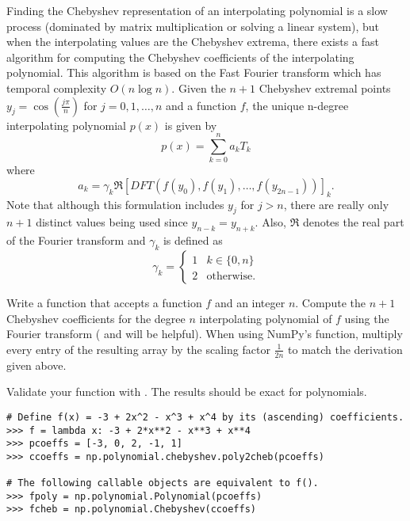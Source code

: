Finding the Chebyshev representation of an interpolating polynomial is a slow process (dominated by matrix multiplication or solving a linear system), but when the interpolating values are the
Chebyshev extrema, there exists a fast algorithm for computing the Chebyshev coefficients of the interpolating polynomial.
This algorithm is based on the Fast Fourier transform which has temporal complexity $O(n\log n)$.
Given the $n+1$ Chebyshev extremal points $y_j=\cos(\frac{j\pi}{n})$ for $j=0,1,\dots,n$ and a function $f$, the unique n-degree interpolating polynomial $p(x)$ is given by
\[
p(x)=\sum_{k=0}^na_kT_k
\]
where
\[
a_k = \gamma_k \Re \left[ DFT(f(y_0), f(y_1),\dots, f(y_{2n-1}))\right]_k.
\]
Note that although this formulation includes $y_j$ for $j>n$, there are really only $n+1$ distinct values being used since $y_{n-k}=y_{n+k}$.
Also, $\Re$ denotes the real part of the Fourier transform and $\gamma_k$ is defined as
\[
\gamma_k =
\begin{cases}
1 & k\in \{0,n\} \\
2 & \text{otherwise.}
\end{cases}
\]

\begin{problem}
Write a function that accepts a function $f$ and an integer $n$.
Compute the $n+1$ Chebyshev coefficients for the degree $n$ interpolating polynomial of $f$ using the Fourier transform ( and  will be helpful).
When using NumPy's  function, multiply every entry of the resulting array by the scaling factor $\frac{1}{2n}$ to match the derivation given above.

Validate your function with .
The results should be exact for polynomials.
\begin{lstlisting}
# Define f(x) = -3 + 2x^2 - x^3 + x^4 by its (ascending) coefficients.
>>> f = lambda x: -3 + 2*x**2 - x**3 + x**4
>>> pcoeffs = [-3, 0, 2, -1, 1]
>>> ccoeffs = np.polynomial.chebyshev.poly2cheb(pcoeffs)

# The following callable objects are equivalent to f().
>>> fpoly = np.polynomial.Polynomial(pcoeffs)
>>> fcheb = np.polynomial.Chebyshev(ccoeffs)
\end{lstlisting}
\end{problem}

